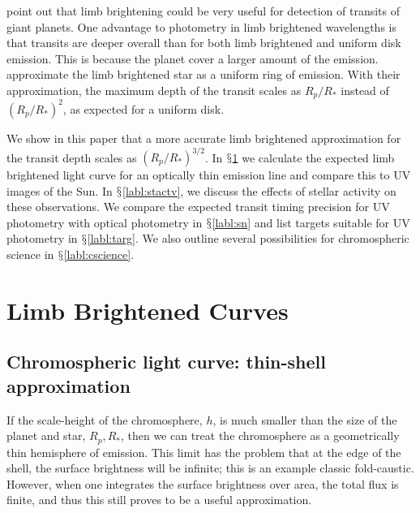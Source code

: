 \documentclass[twocolumn]{emulateapj}
\begin{document}
\citet{assef} point out that limb brightening could be
very useful for detection of transits of giant planets. One advantage
to photometry in limb brightened wavelengths is that transits are
deeper overall than for both limb brightened and uniform disk
emission. This is because the planet cover a larger amount of the
emission. \citet{assef} approximate the limb brightened
star as a uniform ring of emission. With their approximation, the maximum depth
of the transit scales as $R_p/R_*$ instead of $(R_p/R_*)^2$,
as expected for a uniform disk.

We show in this paper that a more accurate limb brightened
approximation for the transit depth scales as $(R_p/R_*)^{3/2}$. In
$\mathsection$\ref{labl:chromlcurve} we calculate the expected limb
brightened light curve for an optically thin emission line and compare
this to UV images of the Sun. In $\mathsection$\ref{labl:stactv}, we
discuss the effects of stellar activity on these observations. We
compare the expected transit timing precision for UV photometry with
optical photometry in $\mathsection$\ref{labl:sn} and list targets
suitable for UV photometry in $\mathsection$\ref{labl:targ}. We also
outline several possibilities for chromospheric science in
$\mathsection$\ref{labl:cscience}.

\section{Limb Brightened Curves} \label{labl:chromlcurve}

\subsection{Chromospheric light curve: thin-shell approximation}
\label{labl:thinshell}
If the scale-height of the chromosphere, $h$, is much smaller than the
size of the planet and star, $R_p, R_*$, then we can treat the
chromosphere as a geometrically thin hemisphere of emission.  This
limit has the problem that at the edge of the shell, the surface
brightness will be infinite; this is an example classic fold-caustic.
However, when one integrates the surface brightness over area, the
total flux is finite, and thus this still proves to be a useful
approximation.

\end{document}
